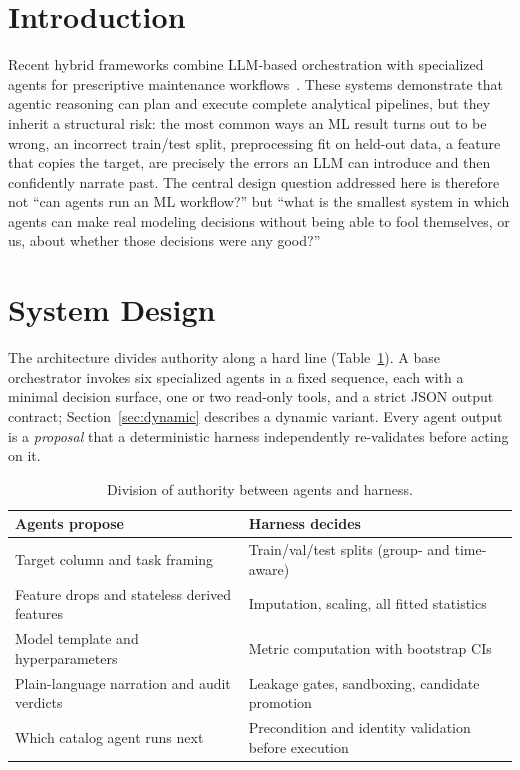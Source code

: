 \documentclass[5p,times]{elsarticle}
\begin{document}

\section{Introduction}
Recent hybrid frameworks combine LLM-based orchestration with specialized agents for prescriptive maintenance workflows~\cite{farahani2026}. These systems demonstrate that agentic reasoning can plan and execute complete analytical pipelines, but they inherit a structural risk: the most common ways an ML result turns out to be wrong, an incorrect train/test split, preprocessing fit on held-out data, a feature that copies the target, are precisely the errors an LLM can introduce and then confidently narrate past. The central design question addressed here is therefore not ``can agents run an ML workflow?'' but ``what is the smallest system in which agents can make real modeling decisions without being able to fool themselves, or us, about whether those decisions were any good?''

\section{System Design}
The architecture divides authority along a hard line (Table~\ref{tab:authority}). A base orchestrator invokes six specialized agents in a fixed sequence, each with a minimal decision surface, one or two read-only tools, and a strict JSON output contract; Section~\ref{sec:dynamic} describes a dynamic variant. Every agent output is a \emph{proposal} that a deterministic harness independently re-validates before acting on it.

\begin{table}[h]
\caption{Division of authority between agents and harness.}
\label{tab:authority}
\centering
\small
\begin{tabular}{p{3.6cm}p{3.6cm}}
\toprule
\textbf{Agents propose} & \textbf{Harness decides} \\
\midrule
Target column and task framing & Train/val/test splits (group- and time-aware) \\
Feature drops and stateless derived features & Imputation, scaling, all fitted statistics \\
Model template and hyperparameters & Metric computation with bootstrap CIs \\
Plain-language narration and audit verdicts & Leakage gates, sandboxing, candidate promotion \\
Which catalog agent runs next & Precondition and identity validation before execution \\
\bottomrule
\end{tabular}
\end{table}
\end{document}
